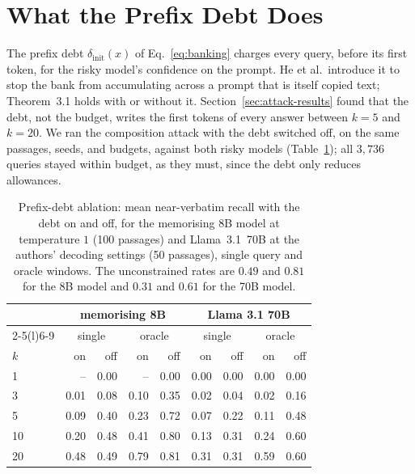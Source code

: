 \section{What the Prefix Debt Does}\label{sec:prefixdebt}
The prefix debt $\delta_{\mathrm{init}}(x)$ of Eq.~\eqref{eq:banking} charges every query, before its first token, for the risky model's confidence on the prompt. He et al.\ introduce it to stop the bank from accumulating across a prompt that is itself copied text; Theorem~3.1 holds with or without it. Section~\ref{sec:attack-results} found that the debt, not the budget, writes the first tokens of every answer between $k=5$ and $k=20$. We ran the composition attack with the debt switched off, on the same passages, seeds, and budgets, against both risky models (Table~\ref{tab:prefixdebt}); all $3{,}736$ queries stayed within budget, as they must, since the debt only reduces allowances.

\begin{table}[t]
\centering
\caption{Prefix-debt ablation: mean near-verbatim recall with the debt on and off, for the memorising 8B model at temperature $1$ (100 passages) and Llama~3.1~70B at the authors' decoding settings (50 passages), single query and oracle windows. The unconstrained rates are $0.49$ and $0.81$ for the 8B model and $0.31$ and $0.61$ for the 70B model.}
\label{tab:prefixdebt}
\small
\setlength{\tabcolsep}{4pt}
\begin{tabular}{@{}lrrrrrrrr@{}}
\toprule
& \multicolumn{4}{c}{memorising 8B} & \multicolumn{4}{c}{Llama 3.1 70B} \\
\cmidrule(lr){2-5}\cmidrule(l){6-9}
& \multicolumn{2}{c}{single} & \multicolumn{2}{c}{oracle} & \multicolumn{2}{c}{single} & \multicolumn{2}{c}{oracle} \\
$k$ & on & off & on & off & on & off & on & off \\
\midrule
1 & -- & 0.00 & -- & 0.00 & 0.00 & 0.00 & 0.00 & 0.00 \\
3 & 0.01 & 0.08 & 0.10 & 0.35 & 0.02 & 0.04 & 0.02 & 0.16 \\
5 & 0.09 & 0.40 & 0.23 & 0.72 & 0.07 & 0.22 & 0.11 & 0.48 \\
10 & 0.20 & 0.48 & 0.41 & 0.80 & 0.13 & 0.31 & 0.24 & 0.60 \\
20 & 0.48 & 0.49 & 0.79 & 0.81 & 0.31 & 0.31 & 0.59 & 0.60 \\
\bottomrule
\end{tabular}
\end{table}

